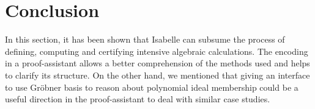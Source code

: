\documentclass[runningheads]{llncs}
\begin{document}
\section{Conclusion}

In this section, it has been shown that Isabelle can subsume the process of defining, computing and certifying intensive algebraic calculations. The encoding in a proof-assistant allows a better comprehension of the methods used and helps to clarify its structure. On the other hand, we mentioned that giving an interface to use Gr\"{o}bner basis to reason about polynomial ideal membership could be a useful direction in the proof-assistant to deal with similar case studies.

%
%
%
% 
% 
\printbibliography
%
\end{document}
